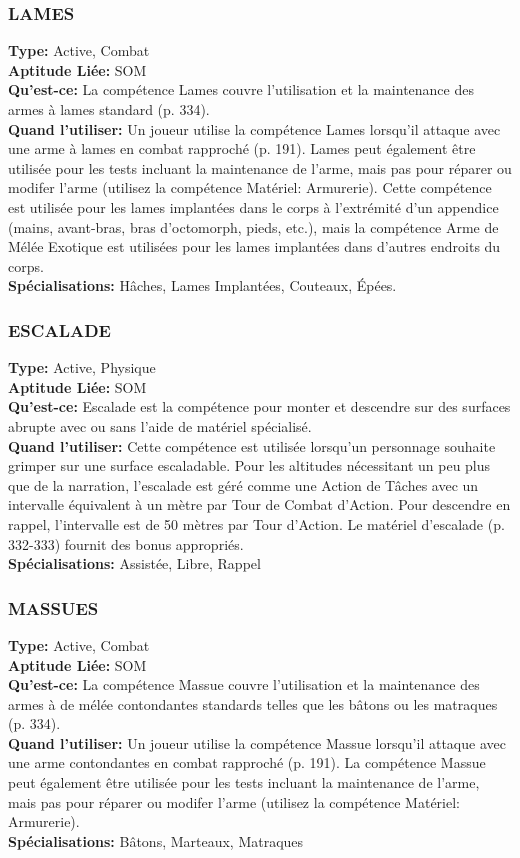 \subsubsection{LAMES} \textbf{Type:} Active, Combat \\ \textbf{Aptitude Liée:} SOM \\ \textbf{Qu'est-ce:} La compétence Lames couvre l'utilisation et la maintenance des armes à lames standard (p. 334). \\ \textbf{Quand l'utiliser:} Un joueur utilise la compétence Lames lorsqu'il attaque avec une arme à lames en combat rapproché (p. 191). Lames peut également être utilisée pour les tests incluant la maintenance de l'arme, mais pas pour réparer ou modifer l'arme (utilisez la compétence Matériel: Armurerie). Cette compétence est utilisée pour les lames implantées dans le corps à l'extrémité d'un appendice (mains, avant-bras, bras d'octomorph, pieds, etc.), mais la compétence Arme de Mélée Exotique est utilisées pour les lames implantées dans d'autres endroits du corps. \\ \textbf{Spécialisations:} Hâches, Lames Implantées, Couteaux, Épées. 

\subsubsection{ESCALADE}
\textbf{Type:} Active, Physique\\
\textbf{Aptitude Liée:} SOM \\
\textbf{Qu'est-ce:} Escalade est la compétence pour monter et descendre sur des surfaces abrupte avec ou sans l'aide de matériel spécialisé. \\
\textbf{Quand l'utiliser:} Cette compétence est utilisée lorsqu'un personnage souhaite grimper sur une surface escaladable. Pour les altitudes nécessitant un peu plus que de la narration, l'escalade est géré comme une Action de Tâches avec un intervalle équivalent à un mètre par Tour de Combat d'Action. Pour descendre en rappel, l'intervalle est de 50 mètres par Tour d'Action. Le matériel d'escalade (p. 332-333) fournit des bonus appropriés. \\
\textbf{Spécialisations:} Assistée, Libre, Rappel

\subsubsection{MASSUES} \textbf{Type:} Active, Combat \\ \textbf{Aptitude Liée:} SOM \\ \textbf{Qu'est-ce:} La compétence Massue couvre l'utilisation et la maintenance des armes à de mélée contondantes standards telles que les bâtons ou les matraques (p. 334). \\ \textbf{Quand l'utiliser:} Un joueur utilise la compétence Massue lorsqu'il attaque avec une arme contondantes en combat rapproché (p. 191). La compétence Massue peut également être utilisée pour les tests incluant la maintenance de l'arme, mais pas pour réparer ou modifer l'arme (utilisez la compétence Matériel: Armurerie). \\ \textbf{Spécialisations:} Bâtons, Marteaux, Matraques 

